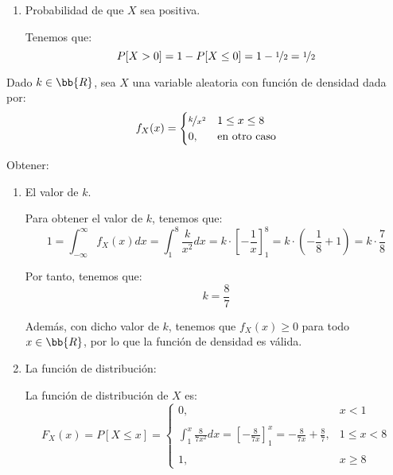 \begin{ejercicio}
\begin{enumerate}
        \item Probabilidad de que $X$ sea positiva.
        
        Tenemos que:
        \begin{equation*}
            P[X>0] = 1-P[X\leq 0] = 1 - \nicefrac{1}{2} = \nicefrac{1}{2}
        \end{equation*}
    \end{enumerate}
\end{ejercicio}


\begin{ejercicio}
    Dado $k\in \bb{R}$, sea $X$ una variable aleatoria con función de densidad dada por:
    \begin{equation*}
        f_X(x) = \begin{cases}
            \nicefrac{k}{x^2} & 1\leq x\leq 8 \\
            0, & \text{en otro caso}
        \end{cases}
    \end{equation*}

    Obtener:
    \begin{enumerate}
        \item El valor de $k$.
        
        Para obtener el valor de $k$, tenemos que:
        \begin{equation*}
            1 = \int_{-\infty}^{\infty}f_X(x)dx = \int_{1}^{8}\frac{k}{x^2}dx = k\cdot \left[-\frac{1}{x}\right]_{1}^{8} = k\cdot \left(-\frac{1}{8} + 1\right) = k\cdot \frac{7}{8}
        \end{equation*}

        Por tanto, tenemos que:
        \begin{equation*}
            k = \frac{8}{7}
        \end{equation*}

        Además, con dicho valor de $k$, tenemos que $f_X(x)\geq 0$ para todo $x\in \bb{R}$, por lo que la función de densidad es válida.

        \item La función de distribución:
        
        La función de distribución de $X$ es:
        \begin{equation*}
            F_X(x) = P[X\leq x] = \begin{cases}
                0, & x<1 \\ \\
                \displaystyle \int_1^x\frac{8}{7x^2}dx = \left[-\frac{8}{7x}\right]_{1}^{x} = -\frac{8}{7x} + \frac{8}{7}, & 1\leq x < 8 \\ \\
                1, & x\geq 8
            \end{cases}
        \end{equation*}


\end{enumerate}
\end{ejercicio}
